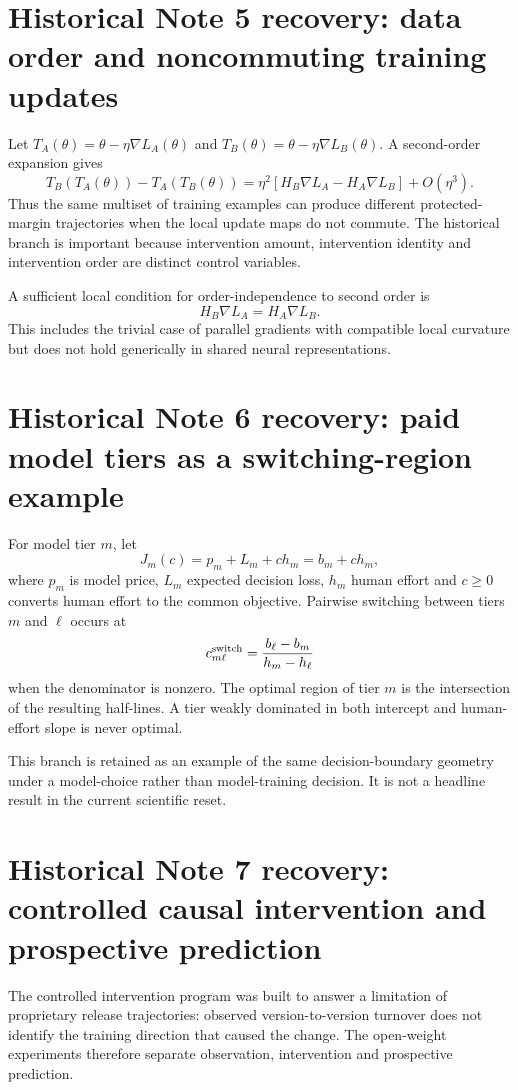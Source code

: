 \documentclass[11pt,letterpaper]{article}
\theoremstyle{plain}
\newcommand{\1}{\mathbf 1}
\begin{document}
\section{Historical Note 5 recovery: data order and noncommuting training updates}
Let $T_A(\theta)=\theta-\eta\nabla L_A(\theta)$ and $T_B(\theta)=\theta-\eta\nabla L_B(\theta)$. A second-order expansion gives
\begin{equation}
 T_B(T_A(\theta))-T_A(T_B(\theta))
 =\eta^2\left[H_B\nabla L_A-H_A\nabla L_B\right]+O(\eta^3).
\end{equation}
Thus the same multiset of training examples can produce different protected-margin trajectories when the local update maps do not commute. The historical branch is important because intervention amount, intervention identity and intervention order are distinct control variables.

A sufficient local condition for order-independence to second order is
\begin{equation}
 H_B\nabla L_A=H_A\nabla L_B.
\end{equation}
This includes the trivial case of parallel gradients with compatible local curvature but does not hold generically in shared neural representations.

\clearpage
\section{Historical Note 6 recovery: paid model tiers as a switching-region example}
For model tier $m$, let
\begin{equation}
 J_m(c)=p_m+L_m+c h_m=b_m+c h_m,
\end{equation}
where $p_m$ is model price, $L_m$ expected decision loss, $h_m$ human effort and $c\ge0$ converts human effort to the common objective. Pairwise switching between tiers $m$ and $\ell$ occurs at
\begin{equation}
 c_{m\ell}^{\rm switch}=\frac{b_\ell-b_m}{h_m-h_\ell}
\end{equation}
when the denominator is nonzero. The optimal region of tier $m$ is the intersection of the resulting half-lines. A tier weakly dominated in both intercept and human-effort slope is never optimal.

This branch is retained as an example of the same decision-boundary geometry under a model-choice rather than model-training decision. It is not a headline result in the current scientific reset.

\clearpage
\section{Historical Note 7 recovery: controlled causal intervention and prospective prediction}
The controlled intervention program was built to answer a limitation of proprietary release trajectories: observed version-to-version turnover does not identify the training direction that caused the change. The open-weight experiments therefore separate observation, intervention and prospective prediction.
\end{document}
